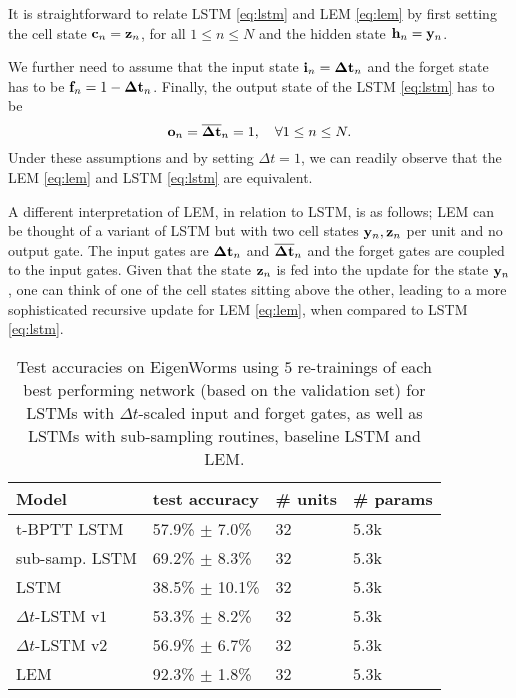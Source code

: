 \documentclass{article} \usepackage{iclr2022_conference,times}
\newcommand{\by}{{\bf y}}
\newcommand{\bz}{{\bf z}}
\newcommand{\Dt}{{\Delta t}}
\begin{document}
It is straightforward to relate LSTM \eqref{eq:lstm} and LEM \eqref{eq:lem} by first setting the cell state ${\bf c}_n = \bz_n$, for all $1 \leq n \leq N$ and the hidden state ${\bf h}_{n} = \by_n$.

We further need to assume that the input state ${\bf i}_n = {\bf \Dt}_n$ and the forget state has to be ${\bf f}_n = 1 - {\bf \Dt}_n$. Finally, the output state of the LSTM \eqref{eq:lstm} has to be
$$
{\bf o}_n = \overline{\bf \Dt}_n = 1, \quad \forall 1 \leq n \leq N.
$$
Under these assumptions and by setting $\Dt =1$, we can readily observe that the LEM \eqref{eq:lem} and LSTM \eqref{eq:lstm} are equivalent.

A different interpretation of LEM, in relation to LSTM, is as follows; LEM can be thought of a variant of LSTM but with two cell states $\by_n,\bz_n$ per unit and no output gate. The input gates are ${\bf \Dt}_n$ and ${\bf \overline{\Dt}}_n$ and the forget gates are coupled to the input gates. Given that the state $\bz_n$ is fed into the update for the state $\by_n$, one can think of one of the cell states sitting above the other, leading to a more sophisticated recursive update for LEM \eqref{eq:lem}, when compared to LSTM \eqref{eq:lstm}. 


\begin{table}[h!]
\caption{Test accuracies on EigenWorms using $5$ re-trainings of each best performing network (based on the validation set) for LSTMs with $\Dt$-scaled input and forget gates, as well as LSTMs with sub-sampling routines, baseline LSTM and LEM.}
\label{tab:dt_scaled_lstms}
\centering
\begin{tabular}{llll}
\toprule
\cmidrule(r){1-4}
Model & test accuracy & \# units & \# params \\
\midrule
t-BPTT LSTM & 57.9\% $\pm$ 7.0\% &32 & 5.3k\\
sub-samp. LSTM &  69.2\% $\pm$ 8.3\% &32 & 5.3k\\
LSTM & 38.5\% $\pm$ 10.1\% & 32 & 5.3k  \\
$\Dt$-LSTM v$1$ & 53.3\% $\pm$ 8.2\% & 32 & 5.3k  \\
$\Dt$-LSTM v$2$ & 56.9\% $\pm$ 6.7\% & 32 & 5.3k  \\
LEM & 92.3\% $\pm$ 1.8\% & 32 & 5.3k \\
    \bottomrule
  \end{tabular}
\end{table}
\end{document}
